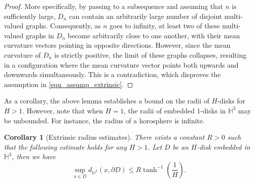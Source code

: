 \documentclass[12pt,a4paper]{amsart}
\numberwithin{equation}{section}
\theoremstyle{plain}
\newtheorem{Cor}[Th]{Corollary}
\theoremstyle{named}
\theoremstyle{definition}
\begin{document}
\begin{proof}
    More specifically, by passing to a subsequence and assuming that $n$ is sufficiently large, $D_n$ can contain an arbitrarily large number of disjoint multi-valued graphs. Consequently, as $n$ goes to infinity, at least two of these multi-valued graphs in $D_n$ become arbitrarily close to one another, with their mean curvature vectors pointing in opposite directions.
    However, since the mean curvature of $D_n$ is strictly positive, the limit of these graphs collapses, resulting in a configuration where the mean curvature vector points both upwards and downwards simultaneously. This is a contradiction, which disproves the assumption in \eqref{equ_assump_extrinsic}.
\end{proof}

As a corollary, the above lemma establishes a bound on the radii of $H$-disks for $H > 1$. However, note that when $H = 1$, the radii of embedded $1$-disks in $\mathbb{H}^3$ may be unbounded. For instance, the radius of a horosphere is infinite.

\begin{Cor}[Extrinsic radius estimates]\label{cor_extrinsic radius}
   There exists a constant $R>0$ such that the following estimate holds for any $H>1$. Let $D$ be an $H$-disk embedded in $\mathbb{H}^3$, then we have \begin{equation*}
        \sup_{x\in D}d_{\mathbb{H}^3}(x,\partial D)\leq R\tanh^{-1}\left(\frac{1}{H}\right).
    \end{equation*}
\end{Cor}
\end{document}
